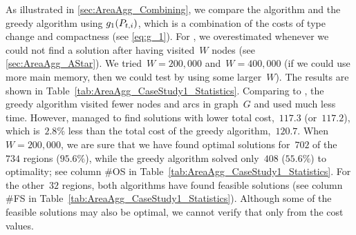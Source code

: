 As illustrated in \sect\ref{sec:AreaAgg_Combining},
we compare the \Astar algorithm and 
the greedy algorithm using $g_1(P_{t,i})$,
which is a combination of the costs 
of type change and compactness (see \eq\ref{eq:g_1}).
For \Astar, we overestimated 
whenever we could not find a solution after 
having visited~$W$ nodes 
(see \sect\ref{sec:AreaAgg_AStar}).
We tried~$W=200{,}000$ and~$W=400{,}000$
(if we could use more main memory, 
then we could test by using some larger~$W$). 
The results are shown in 
Table~\ref{tab:AreaAgg_CaseStudy1_Statistics}.
%
Comparing to \Astar, 
the greedy algorithm visited 
fewer nodes and arcs in graph~$G$ 
and used much less time.
However, \Astar managed to find solutions with 
lower total cost,~$117.3$ (or~$117.2$), 
which is~$2.8\%$ less than 
the total cost of the greedy algorithm,~$120.7$.
%
When~$W=200{,}000$, we are sure that 
we have found optimal solutions 
for~$702$ of the~$734$ regions ($95.6\%$),
while the greedy algorithm solved 
only~$408$ ($55.6\%$) to optimality;
see column \#OS in 
Table~\ref{tab:AreaAgg_CaseStudy1_Statistics}.
For the other~$32$ regions, 
both algorithms have found feasible solutions 
(see column \#FS in 
Table~\ref{tab:AreaAgg_CaseStudy1_Statistics}).
Although some of the feasible solutions may also be optimal,
we cannot verify that only from the cost values.


